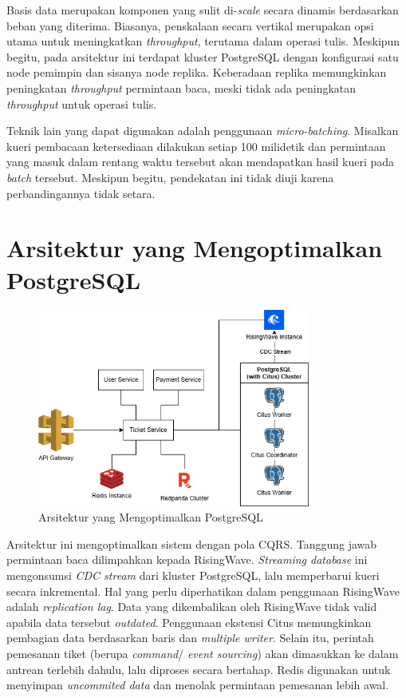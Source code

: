 Basis data merupakan komponen yang sulit di-\textit{scale} secara dinamis berdasarkan beban yang diterima. Biasanya, penskalaan secara vertikal merupakan opsi utama untuk meningkatkan \textit{throughput}, terutama dalam operasi tulis. Meskipun begitu, pada arsitektur ini terdapat kluster PostgreSQL dengan konfigurasi satu node pemimpin dan sisanya node replika. Keberadaan replika memungkinkan peningkatan \textit{throughput} permintaan baca, meski tidak ada peningkatan \textit{throughput} untuk operasi tulis.

Teknik lain yang dapat digunakan adalah penggunaan \textit{micro-batching}. Misalkan kueri pembacaan ketersediaan dilakukan setiap 100 milidetik dan permintaan yang masuk dalam rentang waktu tersebut akan mendapatkan hasil kueri pada \textit{batch} tersebut. Meskipun begitu, pendekatan ini tidak diuji karena perbandingannya tidak setara.

\section{Arsitektur yang Mengoptimalkan PostgreSQL}

\begin{figure}[ht]
    \centering
    \includegraphics[width=0.8\textwidth]{resources/chapter-3/architecture-optimized.png}
    \caption{Arsitektur yang Mengoptimalkan PostgreSQL}
    \label{fig:optimized-architecture}
\end{figure}

Arsitektur ini mengoptimalkan sistem dengan pola CQRS. Tanggung jawab permintaan baca dilimpahkan kepada RisingWave. \textit{Streaming database} ini mengonsumsi \textit{CDC stream} dari kluster PostgreSQL, lalu memperbarui kueri secara inkremental. Hal yang perlu diperhatikan dalam penggunaan RisingWave adalah \textit{replication lag}. Data yang dikembalikan oleh RisingWave tidak valid apabila data tersebut \textit{outdated}. Penggunaan ekstensi Citus memungkinkan pembagian data berdasarkan baris dan \textit{multiple writer}. Selain itu, perintah pemesanan tiket (berupa \textit{command}/ \textit{event sourcing}) akan dimasukkan ke dalam antrean terlebih dahulu, lalu diproses secara bertahap. Redis digunakan untuk menyimpan \textit{uncommited data} dan menolak permintaan pemesanan lebih awal.

